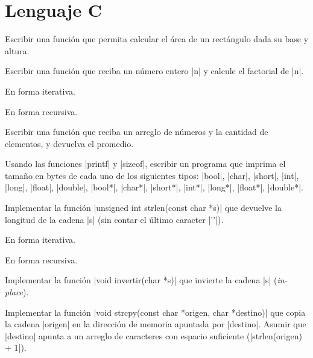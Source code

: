 \lstset{
    language=C,
}

\chapter{Lenguaje C}

\begin{ejercicio}
Escribir una función que permita calcular el área de un rectángulo dada
su base y altura.
\end{ejercicio}

\begin{ejercicio}
Escribir una función que reciba un número entero |n| y calcule el factorial de
|n|.
\begin{partes}
    \item En forma iterativa.
    \item En forma recursiva.
\end{partes}
\end{ejercicio}

\begin{ejercicio}
Escribir una función que reciba un arreglo de números y la cantidad de
elementos, y devuelva el promedio.
\end{ejercicio}

\begin{ejercicio}
    Usando las funciones |printf| y |sizeof|, escribir un programa que imprima
    el tamaño en bytes de cada uno de los siguientes tipos: |bool|, |char|,
    |short|, |int|, |long|, |float|, |double|, |bool*|, |char*|,
    |short*|, |int*|, |long*|, |float*|, |double*|.
\end{ejercicio}

\begin{ejercicio}
Implementar la función |unsigned int strlen(const char *s)| que devuelve la
longitud de la cadena |s| (sin contar el último caracter |'\0'|).
\begin{partes}
    \item En forma iterativa.
    \item En forma recursiva.
\end{partes}
\end{ejercicio}

\begin{ejercicio}
Implementar la función |void invertir(char *s)| que invierte la cadena
|s| ({\it in-place}).
\end{ejercicio}

\begin{ejercicio}
Implementar la función |void strcpy(const char *origen, char *destino)| que
copia la cadena |origen| en la dirección de memoria apuntada por |destino|.
Asumir que |destino| apunta a un arreglo de caracteres con espacio suficiente
(|strlen(origen) + 1|).
\end{ejercicio}

